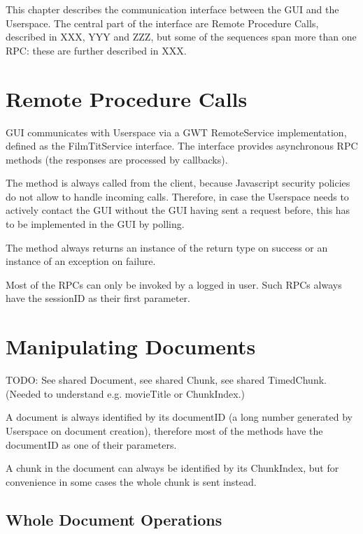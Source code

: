 \label{chap:communication}
\label{sec:communication}

This chapter describes the communication interface between the GUI and the Userspace. The central part of the interface are Remote Procedure Calls, described in XXX, YYY and ZZZ, but some of the sequences span more than one RPC: these are further described in XXX.

\section{Remote Procedure Calls}

GUI communicates with Userspace via a GWT RemoteService implementation, defined as the FilmTitService interface.
The interface provides asynchronous RPC methods (the responses are processed by callbacks).

The method is always called from the client, because Javascript security policies do not allow to handle incoming calls.
Therefore, in case the Userspace needs to actively contact the GUI without the GUI having sent a request before,
this has to be implemented in the GUI by polling.

The method always returns an instance of the return type on success or an instance of an exception on failure.

Most of the RPCs can only be invoked by a logged in user. Such RPCs always have the sessionID as their first parameter.

\section{Manipulating Documents}

TODO: See shared Document, see shared Chunk, see shared TimedChunk.
(Needed to understand e.g. movieTitle or ChunkIndex.)

A document is always identified by its documentID (a long number generated by Userspace on document creation), therefore most of the methods have the documentID as one of their parameters.

A chunk in the document can always be identified by its ChunkIndex, but for convenience in some cases the whole chunk is sent instead.

\subsection{Whole Document Operations}

